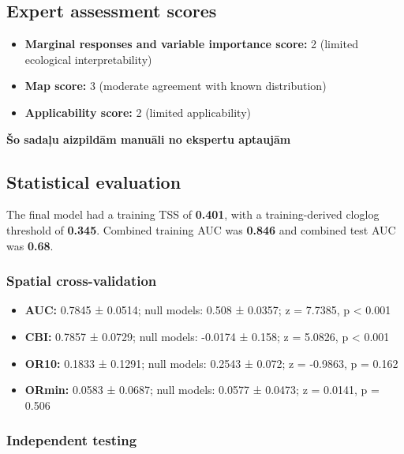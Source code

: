 \documentclass[
  openany]{book}
\providecommand{\tightlist}{%
  \setlength{\itemsep}{0pt}\setlength{\parskip}{0pt}}
\providecommand{\tightlist}{%
  \setlength{\itemsep}{0pt}%
  \setlength{\parskip}{0pt}%
}
\begin{document}
\subsection*{Expert assessment scores}\label{expert-assessment-scores-19}

\begin{itemize}
\tightlist
\item
  \textbf{Marginal responses and variable importance score:} 2 (limited ecological interpretability)
\item
  \textbf{Map score:} 3 (moderate agreement with known distribution)
\item
  \textbf{Applicability score:} 2 (limited applicability)
\end{itemize}

\textbf{Šo sadaļu aizpildām manuāli no ekspertu aptaujām}

\subsection*{Statistical evaluation}\label{statistical-evaluation-19}

The final model had a training TSS of \textbf{0.401}, with a training-derived cloglog threshold of \textbf{0.345}. Combined training AUC was \textbf{0.846} and combined test AUC was \textbf{0.68}.

\subsubsection*{Spatial cross-validation}\label{spatial-cross-validation-19}

\begin{itemize}
\tightlist
\item
  \textbf{AUC:} 0.7845 ± 0.0514; null models: 0.508 ± 0.0357; z = 7.7385, p \textless{} 0.001
\item
  \textbf{CBI:} 0.7857 ± 0.0729; null models: -0.0174 ± 0.158; z = 5.0826, p \textless{} 0.001
\item
  \textbf{OR10:} 0.1833 ± 0.1291; null models: 0.2543 ± 0.072; z = -0.9863, p = 0.162
\item
  \textbf{ORmin:} 0.0583 ± 0.0687; null models: 0.0577 ± 0.0473; z = 0.0141, p = 0.506
\end{itemize}

\subsubsection*{Independent testing}\label{independent-testing-19}
\end{document}
